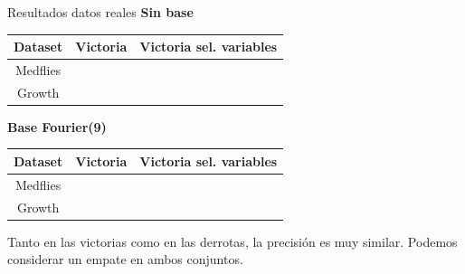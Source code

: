 \documentclass[10pt, spanish, professionalfonts]{beamer}
\newcommand{\cmark}{\ding{51}}%
\newcommand{\xmark}{\ding{55}}%
\begin{document}
\begin{frame}{Resultados datos reales}
\textbf{Sin base}
  \begin{table}
    \begin{tabular}{c|cc}
      Dataset & Victoria & Victoria sel. variables \\ \hline
      Medflies & \xmark & \xmark\\
      Growth & \cmark & \cmark\\
    \end{tabular}
  \end{table}

  \textbf{Base Fourier(9)}
  \begin{table}
    \begin{tabular}{c|cc}
      Dataset & Victoria & Victoria sel. variables \\ \hline
      Medflies & \xmark &  \xmark\\
      Growth & \cmark & \cmark\\
    \end{tabular}
  \end{table}

  Tanto en las victorias como en las derrotas, la precisión es muy similar. Podemos considerar un empate en ambos conjuntos.
\end{frame}
\end{document}
